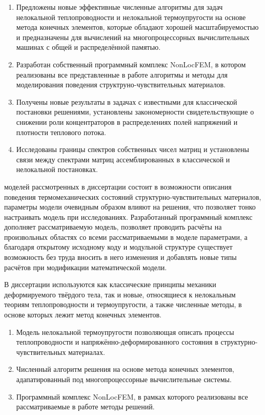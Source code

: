 {\novelty}
\begin{enumerate}[beginpenalty=10000] %
  \item Предложены новые эффективные численные алгоритмы для задач нелокальной теплопроводности и нелокальной термоупругости на основе метода конечных элементов, которые обладают хорошей масштабируемостью и предназначены для вычислений на многопроцессорных вычислительных машинах с общей и распределённой памятью.
  \item Разработан собственный программный комплекс NonLocFEM, в котором реализованы все представленные в работе алгоритмы и методы для моделирования поведения структруно-чувствительных материалов.
  \item Получены новые результаты в задачах с известными для классической постановки решениями, установлены закономерности свидетельствующие о снижении роли концентраторов в распределениях полей напряжений и плотности теплового потока.
  \item Исследованы границы спектров собственных чисел матриц и установлены связи между спектрами матриц ассемблированных в классической и нелокальной постановках.
\end{enumerate}

{\influence}
моделей рассмотренных в диссертации состоит в возможности описания поведения термомеханических состояний структурно-чувствительных материалов, параметры модели очевидным образом влияют на решения, что позволяет тонко настраивать модель при исследованиях. Разработанный программный комплекс дополняет рассматриваемую модель, позволяет проводить расчёты на произвольных областях со всеми рассматриваемыми в моделе параметрами, а благодаря открытому исходному коду и модульной структуре существует возможность без труда вносить в него изменения и добавлять новые типы расчётов при модификации математической модели.

{\methods}
В диссертации используются как классические принципы механики деформируемого твёрдого тела, так и новые, относящиеся к нелокальным теориям теплопроводности и термоупругости, а также численные методы, в основе которых лежит метод конечных элементов.

{}
\begin{enumerate}[beginpenalty=10000] %
 	\item Модель нелокальной термоупругости позволяющая описать процессы теплопроводности и напряжённо-деформированного состояния в структурно-чувствительных материалах.
	\item Численный алгоритм решения на основе метода конечных элементов, адапатированный под многопроцессорные вычислительные системы.
	\item Программный комплекс NonLocFEM, в рамках которого реализованы все рассматриваемые в работе методы решений.
\end{enumerate}

